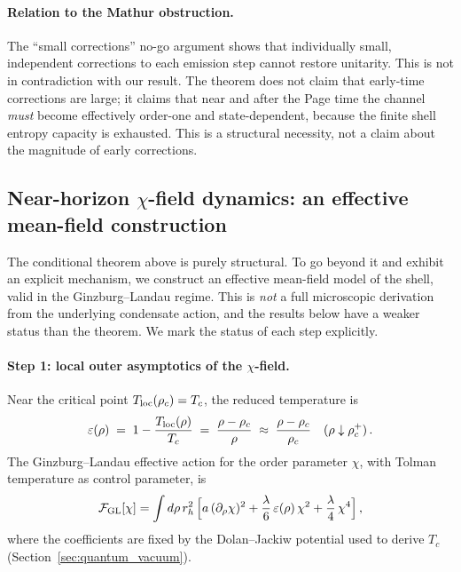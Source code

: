 \documentclass[11pt,a4paper]{article}
\numberwithin{equation}{section}
\begin{document}
\paragraph{Relation to the Mathur obstruction.}
The ``small corrections'' no-go argument \cite{Mathur2009} shows that
individually small, independent corrections to each emission step cannot
restore unitarity.
This is not in contradiction with our result.
The theorem does not claim that early-time corrections are large; it claims
that near and after the Page time the channel \emph{must} become
effectively order-one and state-dependent, because the finite shell entropy
capacity is exhausted.
This is a structural necessity, not a claim about the magnitude of early
corrections.


\subsection{Near-horizon $\chi$-field dynamics: an effective mean-field construction}
\label{app:chi_dynamics}

The conditional theorem above is purely structural.
To go beyond it and exhibit an explicit mechanism, we construct an effective
mean-field model of the shell, valid in the Ginzburg--Landau regime.
This is \emph{not} a full microscopic derivation from the underlying condensate
action, and the results below have a weaker status than the theorem.
We mark the status of each step explicitly.

\paragraph{Step 1: local outer asymptotics of the $\chi$-field.}

Near the critical point $T_{\rm loc}(\rho_c) = T_c$, the reduced temperature is
\begin{equation}
\varepsilon(\rho)
\;=\;
1 - \frac{T_{\rm loc}(\rho)}{T_c}
\;=\;
\frac{\rho - \rho_c}{\rho}
\;\approx\;
\frac{\rho - \rho_c}{\rho_c}
\quad (\rho \downarrow \rho_c^+)\,.
\label{eq:eps_rho2}
\end{equation}
The Ginzburg--Landau effective action for the order parameter $\chi$,
with Tolman temperature as control parameter, is
\begin{equation}
\mathcal{F}_{\rm GL}[\chi]
=
\int d\rho\,r_h^2\,
\Bigl[
a\,(\partial_\rho\chi)^2
+ \frac{\lambda}{6}\,\varepsilon(\rho)\,\chi^2
+ \frac{\lambda}{4}\,\chi^4
\Bigr]\,,
\label{eq:F_GL2}
\end{equation}
where the coefficients are fixed by the Dolan--Jackiw potential
\cite{DolanJackiw1974} used to derive $T_c$ (Section~\ref{sec:quantum_vacuum}).
\end{document}

